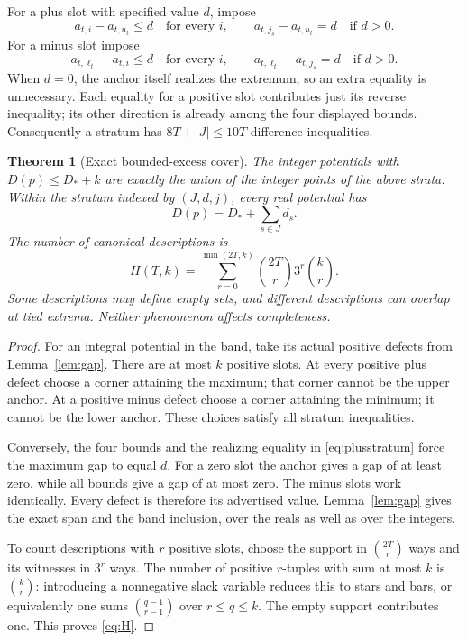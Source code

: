 \documentclass[11pt,letterpaper]{article}
\newtheorem{theorem}{Theorem}[section]
\theoremstyle{definition}
\begin{document}
For a plus slot with specified value $d$, impose
\begin{equation}\label{eq:plusstratum}
 a_{t,i}-a_{t,u_t}\leq d\quad\text{for every }i,
 \qquad a_{t,j_s}-a_{t,u_t}=d\quad\text{if }d>0.
\end{equation}
For a minus slot impose
\begin{equation}\label{eq:minusstratum}
 a_{t,\ell_t}-a_{t,i}\leq d\quad\text{for every }i,
 \qquad a_{t,\ell_t}-a_{t,j_s}=d\quad\text{if }d>0.
\end{equation}
When $d=0$, the anchor itself realizes the extremum, so an extra equality is unnecessary. Each equality for a positive slot contributes just its reverse inequality; its other direction is already among the four displayed bounds. Consequently a stratum has $8T+|J|\leq10T$ difference inequalities.

\begin{theorem}[Exact bounded-excess cover]\label{thm:cover}
The integer potentials with $D(p)\leq D_*+k$ are exactly the union of the integer points of the above strata. Within the stratum indexed by $(J,d,j)$, every real potential has
\[
 D(p)=D_*+\sum_{s\in J}d_s.
\]
The number of canonical descriptions is
\begin{equation}\label{eq:H}
 H(T,k)=\sum_{r=0}^{\min(2T,k)}\binom{2T}{r}3^r\binom{k}{r}.
\end{equation}
Some descriptions may define empty sets, and different descriptions can overlap at tied extrema. Neither phenomenon affects completeness.
\end{theorem}
\begin{proof}
For an integral potential in the band, take its actual positive defects from Lemma~\ref{lem:gap}. There are at most $k$ positive slots. At every positive plus defect choose a corner attaining the maximum; that corner cannot be the upper anchor. At a positive minus defect choose a corner attaining the minimum; it cannot be the lower anchor. These choices satisfy all stratum inequalities.

Conversely, the four bounds and the realizing equality in \eqref{eq:plusstratum} force the maximum gap to equal $d$. For a zero slot the anchor gives a gap of at least zero, while all bounds give a gap of at most zero. The minus slots work identically. Every defect is therefore its advertised value. Lemma~\ref{lem:gap} gives the exact span and the band inclusion, over the reals as well as over the integers.

To count descriptions with $r$ positive slots, choose the support in $\binom{2T}{r}$ ways and its witnesses in $3^r$ ways. The number of positive $r$-tuples with sum at most $k$ is $\binom{k}{r}$: introducing a nonnegative slack variable reduces this to stars and bars, or equivalently one sums $\binom{q-1}{r-1}$ over $r\leq q\leq k$. The empty support contributes one. This proves \eqref{eq:H}.
\end{proof}
\end{document}
